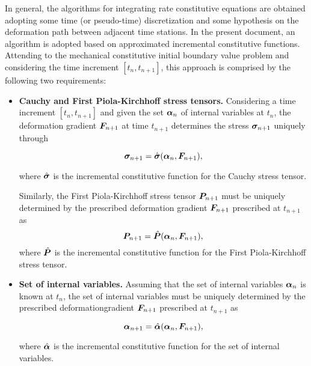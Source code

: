 In general, the algorithms for integrating rate constitutive equations are obtained adopting some time (or pseudo-time) discretization and some hypothesis on the deformation path between adjacent time stations.
In the present document, an algorithm is adopted based on approximated incremental constitutive functions.
Attending to the mechanical constitutive initial boundary value problem and considering the time increment $[t_n, t_{n+1}]$, this approach is comprised by the following two requirements:
\begin{itemize}
    \item \textbf{Cauchy and First Piola-Kirchhoff stress tensors.}   Considering a time increment $[t_n, t_{n+1}]$ and given the set $\bm{\alpha}_n$ of internal variables at $t_n$, the deformation gradient $\bm{F}_{n+1}$ at time $t_{n+1}$ determines the stress $\bm{\sigma}_{n+1}$ uniquely through
    \begin{highlight}
        \begin{equation}
            \bm{\sigma}_{n+1} = \hat{\bm{\sigma}}(\bm{\alpha}_n, \bm{F}_{n+1}), \label{eq:incremental_stress}
        \end{equation}
    \end{highlight}
    where $\hat{\bm{\sigma}}$ is the incremental constitutive function for the Cauchy stress tensor.

    Similarly, the First Piola-Kirchhoff stress tensor $\bm{P}_{n+1}$ must be uniquely determined by the prescribed deformation gradient $\bm{F}_{n+1}$ prescribed at $t_{n+1}$ as
    \begin{equation}
        \bm{P}_{n+1} = \hat{\bm{P}}(\bm{\alpha}_n, \bm{F}_{n+1}),
    \end{equation}
    where $\hat{\bm{P}}$ is the incremental constitutive function for the First Piola-Kirchhoff stress tensor.
    \item \textbf{Set of internal variables.} Assuming that the set of internal variables $\bm{\alpha}_n$ is known at $t_n$, the set of internal variables must be uniquely determined by the prescribed deformationgradient $\bm{F}_{n+1}$ prescribed at $t_{n+1}$ as
    \begin{highlight}
        \begin{equation}
             \bm{\alpha}_{n+1} =\hat{\bm{\alpha}}(\bm{\alpha}_n, \bm{F}_{n+1}), \label{eq:incremental_flux}
        \end{equation}
    \end{highlight}
    where $\hat{\bm{\alpha}}$ is the incremental constitutive function for the set of internal variables.
\end{itemize}

